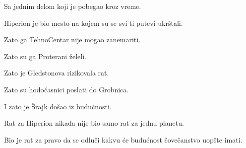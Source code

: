 Sa jednim delom koji je pobegao kroz vreme.

\bigskip

Hiperion je bio mesto na kojem su se svi ti putevi ukrštali.

Zato ga TehnoCentar nije mogao zanemariti.

Zato su ga Proterani želeli.

Zato je Gledstonova rizikovala rat.

Zato su hodočasnici poslati do Grobnica.

I zato je Šrajk došao iz budućnosti.

Rat za Hiperion nikada nije bio samo rat za jednu planetu.

Bio je rat za pravo da se odluči kakvu će budućnost čovečanstvo uopšte imati.